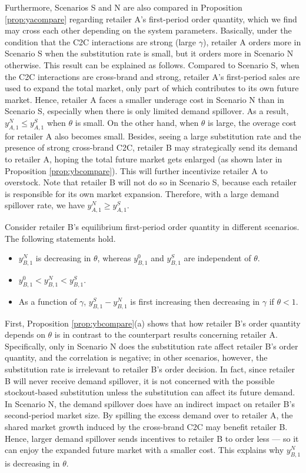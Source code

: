 \documentclass[nonblindrev,copyedit]{informs1}
\begin{document}
Furthermore, Scenarios S and N are also compared in Proposition \ref{prop:yacompare} regarding retailer A's first-period order quantity, which we find may cross each other depending on the system parameters.
Basically, under the condition that the C2C interactions are strong (large $\gamma$), retailer A orders more in Scenario S when the substitution rate is small, but it orders more in Scenario N otherwise. This result can be explained as follows.
Compared to Scenario S, when the C2C interactions are cross-brand and strong, retailer A's first-period sales are used to expand the total market, only part of which contributes to its own future market. Hence, retailer A faces a smaller underage cost in Scenario N than in Scenario S, especially when there is only limited demand spillover. As a result, $y^{N}_{A,1} \leq y^{S}_{A,1}$ when $\theta$ is small.
On the other hand, when $\theta$ is large, the overage cost for retailer A also becomes small. Besides, seeing a large substitution rate and the presence of strong cross-brand C2C, retailer B may strategically send its demand to retailer A, hoping the total future market gets enlarged (as shown later in Proposition \ref{prop:ybcompare}). This will further incentivize retailer A to overstock. Note that retailer B will not do so in Scenario S, because each retailer is responsible for its own market expansion. Therefore, with a large demand spillover rate, we have $y^{N}_{A,1} \geq y^{S}_{A,1}$.

\begin{proposition}
\label{prop:ybcompare}
Consider retailer B's equilibrium first-period order quantity in different scenarios. The following statements hold.
\begin{itemize}
\item[(a)] $y^{N}_{B,1}$ is decreasing in $\theta$, whereas $y^{0}_{B,1}$ and $y^{S}_{B,1}$ are independent of $\theta$.
\item[(b)] $y^{0}_{B,1} < y^{N}_{B,1} < y^{S}_{B,1}$.
\item[(c)] As a function of $\gamma$, $y^{S}_{B,1}-y^{N}_{B,1}$ is first increasing then decreasing in $\gamma$ if $\theta < 1$.
\end{itemize}
\end{proposition}

First, Proposition \ref{prop:ybcompare}(a) shows that how retailer B's order quantity depends on $\theta$ is in contrast to the counterpart results concerning retailer A. Specifically, only in Scenario N does the substitution rate affect retailer B's order quantity, and the correlation is negative; in other scenarios, however, the substitution rate is irrelevant to retailer B's order decision. In fact, since retailer B will never receive demand spillover, it is not concerned with the possible stockout-based substitution unless the substitution can affect its future demand. In Scenario N, the demand spillover does have an indirect impact on retailer B's second-period market size. By spilling the excess demand over to retailer A, the shared market growth induced by the cross-brand C2C may benefit retailer B. Hence, larger demand spillover sends incentives to retailer B to order less --- so it can enjoy the expanded future market with a smaller cost. This explains why $y^{N}_{B,1}$ is decreasing in $\theta$.
\end{document}
